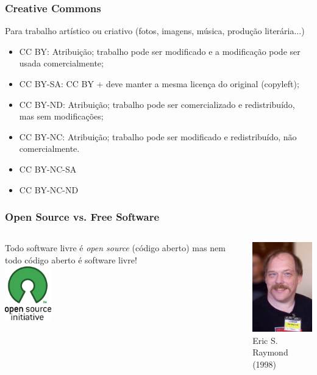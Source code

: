 \documentclass{beamer}
\begin{document}
\begin{frame}
  \frametitle{Creative Commons}
  Para trabalho artístico ou criativo (fotos, imagens, música, produção literária...)
  \begin{itemize}
  \item CC BY: Atribuição; trabalho pode ser modificado e a modificação pode ser usada comercialmente;
  \item CC BY-SA: CC BY + deve manter a mesma licença do original (copyleft);
  \item CC BY-ND: Atribuição; trabalho pode ser comercializado e redistribuído, mas sem modificações;
  \item CC BY-NC: Atribuição; trabalho pode ser modificado e redistribuído, não comercialmente.
  \item CC BY-NC-SA
  \item CC BY-NC-ND
  \end{itemize}
\end{frame}

\begin{frame}
   \frametitle{Open Source vs. Free Software}
   \begin{columns}
     \column{8cm}
     \begin{center}
     Todo software livre é \emph{open source} (código aberto) mas nem todo código aberto é software livre!\\
     \vskip2cm
     \includegraphics[width=2cm]{osi-logo.png}
   \end{center}
   \column{3cm}
   \begin{center}
     \includegraphics[width=3cm]{esr.jpg}\\
     Eric S. Raymond (1998)
   \end{center}
 \end{columns}
\end{frame}
\end{document}
